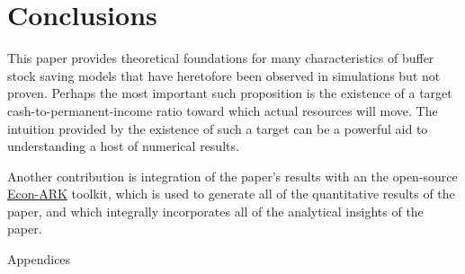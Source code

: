 \documentclass[titlepage]{\econtex}\providecommand{\texname}{BufferStockTheory}%
\providecommand{\ApndxDir}{Appendices}
\begin{document}
\section{Conclusions}

This paper provides theoretical foundations for many characteristics
of buffer stock saving models that have heretofore been observed in
simulations but not proven.  Perhaps the most important such
proposition is the existence of a target cash-to-permanent-income
ratio toward which actual resources will move.  The intuition provided by
the existence of such a target can be a powerful aid to understanding a host
of numerical results.

Another contribution is integration of the paper's results with an the open-source \href{https://econ-ark.org}{Econ-ARK} toolkit, which is used to generate all of the quantitative results of the paper, and which integrally incorporates all of the analytical insights of the paper.

\clearpage\vfill\eject

\appendix

\centerline{\LARGE Appendices}\vspace{0.2in}

\begin{comment}
\section{$\mRat$ Growth in the Perfect Foresight Model} \label{sec:mGrowthPF}

To see why the constraint is irrelevant if
\eqref{eq:PFGIC} fails, recall that for the unconstrained case when
both the FHWC and RIC hold the optimal solution is $\cLevBF_{t} =
(1-\PatR)(\mLevBF_{t}+\hLevBF_{t}-\pLevBF_{t})$, and that
$\cLevBF_{t+1} = {\Pat} \cLevBF_{t}$; combining these
we have
\begin{eqnarray*}
    \mLevBF_{t+1} & = & \Rfree(\mLevBF_{t}-\cLevBF_{t}) + \PGro \pLevBF_{t}\\
  & = & {\Pat}\mLevBF_{t} + \PGro \pLevBF_{t} - (1-\PatR)(\hLevBF_{t}-\pLevBF_{t}) \Rfree
\\ \mRat_{t+1}\PGro & = & {\Pat}\mRat_{t} + \bullet
\\ \mRat_{t+1} & = & \left(\frac{{\Pat}}{\PGro}\right)\mRat_{t} + \bullet/\PGro
\end{eqnarray*}
for some $\bullet$ which can be shown to be positive.
\end{comment}


%
\end{document}
